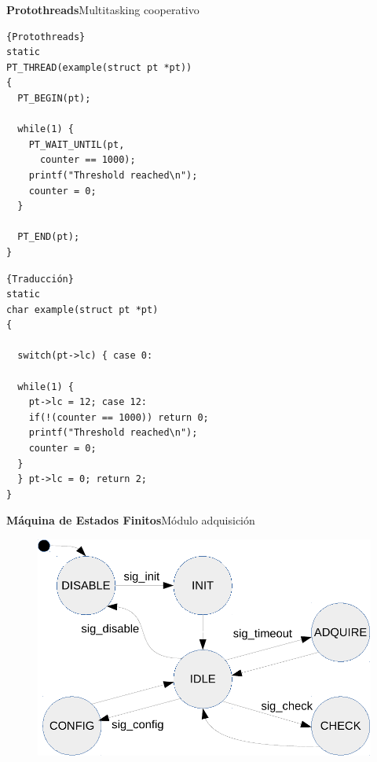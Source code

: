 \documentclass[11pt, xcolor={table,xcdraw}]{beamer}
\begin{document}
\begin{frame}[fragile]{\textbf{\LARGE{Protothreads}}}{Multitasking cooperativo}
	\vspace{-.6cm}
  \begin{minipage}{.5\textwidth}
    \begin{lstlisting}[frame=tlrb,basicstyle=\footnotesize,label={lst:proto1}]{Protothreads}
static
PT_THREAD(example(struct pt *pt))
{
  PT_BEGIN(pt);
  
  while(1) {
    PT_WAIT_UNTIL(pt,
      counter == 1000);
    printf("Threshold reached\n");
    counter = 0;
  }
  
  PT_END(pt);
}
    \end{lstlisting}
  \end{minipage}\hfill
  \begin{minipage}{.5\textwidth}
    \begin{lstlisting}[frame=tlrb,basicstyle=\footnotesize,label={lst:proto2}]{Traducción}
static
char example(struct pt *pt)
{
  
  switch(pt->lc) { case 0:
 
  while(1) {
    pt->lc = 12; case 12:
    if(!(counter == 1000)) return 0;
    printf("Threshold reached\n");
    counter = 0;
  }
  } pt->lc = 0; return 2;
}
    \end{lstlisting}
  \end{minipage}
\end{frame}



\begin{frame}{\textbf{\LARGE{Máquina de Estados Finitos}}}{Módulo adquisición}
	\vspace{-1.1cm}
	\begin{figure}[H]
		\includegraphics[height=.8\textheight]{./imagenes/MEF_adquisicion.pdf}
	\end{figure}	
\end{frame}
\end{document}
